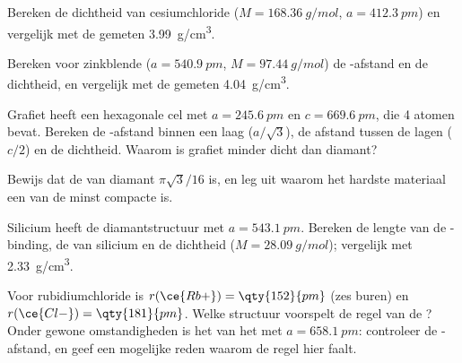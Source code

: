 \begin{exercise}[$\star\star$]\label{exo:b1:crystals-ionic-covalent:7}
Bereken de dichtheid van cesiumchloride ($M = \qty{168.36}{g/mol}$,
$a = \qty{412.3}{pm}$) en vergelijk met de gemeten \qty{3.99}{g/cm^3}.
\end{exercise}


\begin{exercise}[$\star\star$]\label{exo:b1:crystals-ionic-covalent:8}
Bereken voor zinkblende ($a = \qty{540.9}{pm}$, $M = \qty{97.44}{g/mol}$)
de -afstand en de dichtheid, en vergelijk met de gemeten
\qty{4.04}{g/cm^3}.
\end{exercise}


\begin{exercise}[$\star\star$]\label{exo:b1:crystals-ionic-covalent:9}
Grafiet heeft een hexagonale cel met $a = \qty{245.6}{pm}$ en
$c = \qty{669.6}{pm}$, die 4 atomen bevat. Bereken de -afstand
binnen een laag ($a/\sqrt3$), de afstand tussen de lagen ($c/2$) en de
dichtheid. Waarom is grafiet minder dicht dan diamant?
\end{exercise}

\begin{exercise}[$\star\star\star$]\label{exo:b1:crystals-ionic-covalent:10}
Bewijs dat de  van diamant $\pi\sqrt3/16$ is, en leg uit
waarom het hardste materiaal een van de minst compacte is.
\end{exercise}

\begin{exercise}[$\star\star\star$]\label{exo:b1:crystals-ionic-covalent:11}
Silicium heeft de diamantstructuur met $a = \qty{543.1}{pm}$. Bereken de
lengte van de -binding, de  van silicium en de
dichtheid ($M = \qty{28.09}{g/mol}$); vergelijk met \qty{2.33}{g/cm^3}.
\end{exercise}

\begin{exercise}[$\star\star\star$]\label{exo:b1:crystals-ionic-covalent:12}
Voor rubidiumchloride is $r(\ce{Rb+}) = \qty{152}{pm}$ (zes buren) en
$r(\ce{Cl-}) = \qty{181}{pm}$. Welke structuur voorspelt de regel van de
? Onder gewone omstandigheden is het van het 
met $a = \qty{658.1}{pm}$: controleer de -afstand, en geef een
mogelijke reden waarom de regel hier faalt.
\end{exercise}


